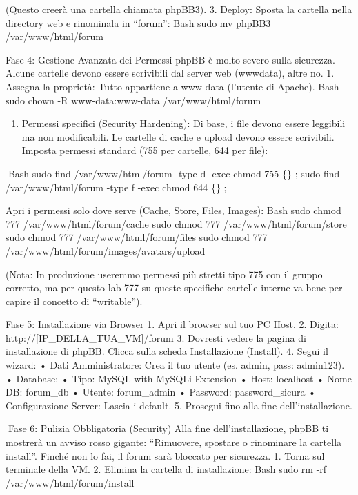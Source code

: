 \documentclass[11pt,a4paper]{article}
\providecommand{\tightlist}{%
  \setlength{\itemsep}{0pt}\setlength{\parskip}{0pt}}
\begin{document}
(Questo creerà una cartella chiamata phpBB3). 3. Deploy: Sposta la
cartella nella directory web e rinominala in ``forum'': Bash sudo mv
phpBB3 /var/www/html/forum

Fase 4: Gestione Avanzata dei Permessi phpBB è molto severo sulla
sicurezza. Alcune cartelle devono essere scrivibili dal server web
(wwwdata), altre no. 1. Assegna la proprietà: Tutto appartiene a
www-data (l'utente di Apache). Bash sudo chown -R www-data:www-data
/var/www/html/forum

\begin{enumerate}
\def\labelenumi{\arabic{enumi}.}
\setcounter{enumi}{1}
\tightlist
\item
  Permessi specifici (Security Hardening): Di base, i file devono essere
  leggibili ma non modificabili. Le cartelle di cache e upload devono
  essere scrivibili. Imposta permessi standard (755 per cartelle, 644
  per file):
\end{enumerate}

Bash sudo find /var/www/html/forum -type d -exec chmod 755 \{\} ; sudo
find /var/www/html/forum -type f -exec chmod 644 \{\} ;

Apri i permessi solo dove serve (Cache, Store, Files, Images): Bash sudo
chmod 777 /var/www/html/forum/cache sudo chmod 777
/var/www/html/forum/store sudo chmod 777 /var/www/html/forum/files sudo
chmod 777 /var/www/html/forum/images/avatars/upload

(Nota: In produzione useremmo permessi più stretti tipo 775 con il
gruppo corretto, ma per questo lab 777 su queste specifiche cartelle
interne va bene per capire il concetto di ``writable'').

Fase 5: Installazione via Browser 1. Apri il browser sul tuo PC Host. 2.
Digita: http://{[}IP\_DELLA\_TUA\_VM{]}/forum 3. Dovresti vedere la
pagina di installazione di phpBB. Clicca sulla scheda Installazione
(Install). 4. Segui il wizard: • Dati Amministratore: Crea il tuo utente
(es. admin, pass: admin123). • Database: • Tipo: MySQL with MySQLi
Extension • Host: localhost • Nome DB: forum\_db • Utente: forum\_admin
• Password: password\_sicura • Configurazione Server: Lascia i default.
5. Prosegui fino alla fine dell'installazione.

Fase 6: Pulizia Obbligatoria (Security) Alla fine dell'installazione,
phpBB ti mostrerà un avviso rosso gigante: ``Rimuovere, spostare o
rinominare la cartella install''. Finché non lo fai, il forum sarà
bloccato per sicurezza. 1. Torna sul terminale della VM. 2. Elimina la
cartella di installazione: Bash sudo rm -rf /var/www/html/forum/install
\end{document}
